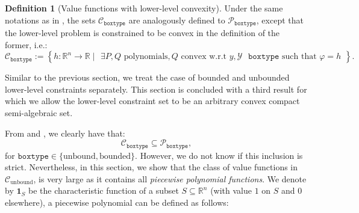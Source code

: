 \documentclass{article}
\newcommand{\mbf}[1]{\mathbf{#1}}
\newcommand*{\cC}{\mathcal{C}}
\newcommand*{\cP}{\mathcal{P}}
\newcommand*{\cY}{\mathcal{Y}}
\newcommand*{\RR}{\mathbb{R}}
\newcommand{\ff}{\varphi}
\newcommand{\formule}{\texttt{mode}}
\newcommand{\property}{\texttt{boxtype}}
\newcommand{\unbounded}{\text{unbound}}
\newcommand{\bounded}{\text{bounded}}
\newcommand{\valbilevel}{\varphi}
\theoremstyle{plain}
\theoremstyle{definition}
\newtheorem{definition}[theorem]{Definition}
\begin{document}
\begin{definition}[Value functions with lower-level convexity]
    \label{def:class-lower-level-convex}
    Under the same notations as in , the sets $\cC_{\property}$ are analogously defined to $\cP_{\property}$, except that the lower-level problem is constrained to be convex in the definition of the former, i.e.:
    \begin{equation}
        \label{eq:convex-class}
        \cC_{\property} := \left\{h: \RR^n \to \RR \mid \begin{array}{c} \exists P, Q \text{ polynomials}, Q \text{ convex w.r.t } y, \cY \text{ $\property$} \text{ such that } \valbilevel = h\end{array} \right\}.
    \end{equation}
\end{definition}
Similar to the previous section, we treat the case of bounded and unbounded lower-level constraints separately. This section is concluded with a third result for which we allow the lower-level constraint set to be an arbitrary convex compact semi-algebraic set.

From  and , we clearly have that: 
\begin{equation*}
    \cC_{\property} \subseteq \cP_{\property},
\end{equation*}
for $\property \in \{\unbounded,\bounded\}$. 
However, we do not know if this inclusion is strict. Nevertheless, in this section, we show that the class of value functions in $\cC_{\unbounded}$, is very large as it contains all \emph{piecewise polynomial functions}. We denote by $\mbf{1}_S$ be the characteristic function of a subset $S \subseteq \RR^n$ (with value $1$ on $S$ and $0$ elsewhere), a piecewise polynomial can be defined as follows:
\end{document}
